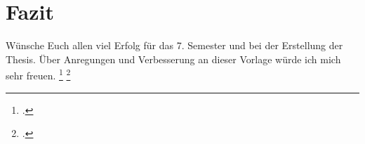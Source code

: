 \section{Fazit}
Wünsche Euch allen viel Erfolg für das 7. Semester und bei der Erstellung der Thesis. Über Anregungen und Verbesserung
an dieser Vorlage würde ich mich sehr freuen.
\footcite[Vgl. ][Seite 5]{Tanenbaum.2003}
\footcite{Tanenbaum.2003}

